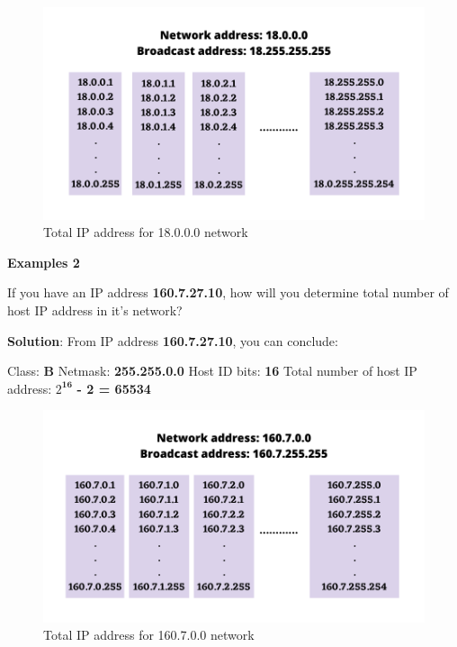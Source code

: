\begin{flushleft}
\begin{figure}[h!]
	\centering
	\includegraphics[scale=.7]{content/chapter14/images/calculation.png}
	\caption{Total IP address for 18.0.0.0 network}
	\label{fig:network1}
\end{figure}	

\newpage

\textbf{Examples 2}

If you have an IP address \textbf{160.7.27.10}, how will you determine total number of host IP address in it's network?	

\textbf{Solution}: From IP address \textbf{160.7.27.10}, you can conclude:
\begin{tcolorbox}[breakable,notitle,boxrule=-0pt,colback=pink,colframe=pink]
	\color{black}
	Class: \textbf{B}
	\newline
	Netmask: \textbf{255.255.0.0}
	\newline
	Host ID bits: \textbf{16}
	\newline
	Total number of host IP address: \textbf{$2^\textbf{16}$} \textbf{- 2 = 65534}
\end{tcolorbox}	

\begin{figure}[h!]
	\centering
	\includegraphics[scale=.7]{content/chapter14/images/calculation2.png}
	\caption{Total IP address for 160.7.0.0 network}
	\label{fig:network1}
\end{figure}	


\end{flushleft}
